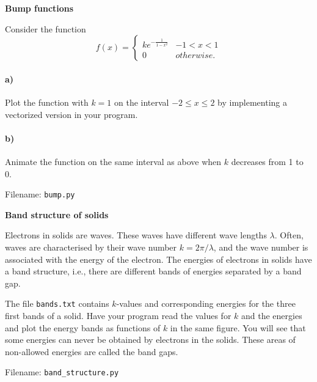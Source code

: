 \begin{Problem}{\textbf{Bump functions}}

\noindent Consider the function
\begin{equation*}
   f(x)=\begin{cases}
       ke^{-\frac{1}{1-x^2}} & -1 < x < 1 \\
       0 & otherwise.
   \end{cases} 
\end{equation*}

\paragraph{a)}
Plot the function with $k=1$ on the interval $-2 \leq x \leq 2$ by implementing
a vectorized version in your program.
    
\paragraph{b)}
Animate the function on the same interval as above when $k$ decreases from
1 to 0.

Filename: \texttt{bump.py}
\end{Problem}

\begin{Problem}{\textbf{Band structure of solids}}

\noindent Electrons in solids are waves. These waves have different wave lengths $\lambda$.
Often, waves are characterised by their wave number $k = 2\pi/\lambda$, and the
wave number is associated with the energy of the electron. The energies of electrons
in solids have a band structure, i.e., there are different bands of energies
separated by a band gap.

The file \texttt{bands.txt} contains $k$-values and corresponding energies for
the three first bands of a solid. Have your program read the values for $k$ and
the energies and plot the energy bands as functions of $k$ in the same figure.
You will see that some energies can never be obtained by electrons in the solids.
These areas of non-allowed energies are called the band gaps.

Filename: \texttt{band\_structure.py}
\end{Problem}


